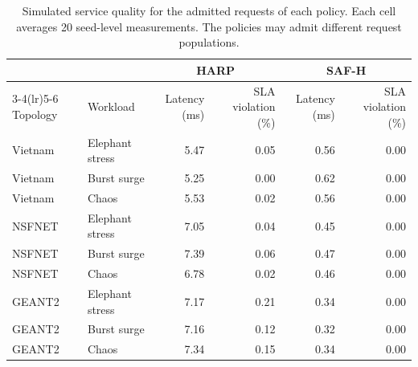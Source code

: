 \documentclass[final,5p]{elsarticle}
\newcommand{\rev}[1]{\textcolor{revisiongreen}{#1}}
\let\newrev\rev
\begin{document}
\begin{table}[p]
\centering
\caption{\newrev{Simulated service quality for the admitted requests of each policy. Each cell averages 20 seed-level measurements. The policies may admit different request populations.}}
\label{tab:stress_qos}
{\color{revisiongreen}
\begin{tabular}{llrrrr}
\toprule
& & \multicolumn{2}{c}{HARP} & \multicolumn{2}{c}{SAF-H} \\
\cmidrule(lr){3-4}\cmidrule(lr){5-6}
Topology & Workload & Latency (ms) & SLA violation (\%) & Latency (ms) & SLA violation (\%) \\
\midrule
Vietnam & Elephant stress & 5.47 & 0.05 & 0.56 & 0.00 \\
Vietnam & Burst surge & 5.25 & 0.00 & 0.62 & 0.00 \\
Vietnam & Chaos & 5.53 & 0.02 & 0.56 & 0.00 \\
NSFNET & Elephant stress & 7.05 & 0.04 & 0.45 & 0.00 \\
NSFNET & Burst surge & 7.39 & 0.06 & 0.47 & 0.00 \\
NSFNET & Chaos & 6.78 & 0.02 & 0.46 & 0.00 \\
GEANT2 & Elephant stress & 7.17 & 0.21 & 0.34 & 0.00 \\
GEANT2 & Burst surge & 7.16 & 0.12 & 0.32 & 0.00 \\
GEANT2 & Chaos & 7.34 & 0.15 & 0.34 & 0.00 \\

\bottomrule
\end{tabular}
}
\end{table}
\end{document}

